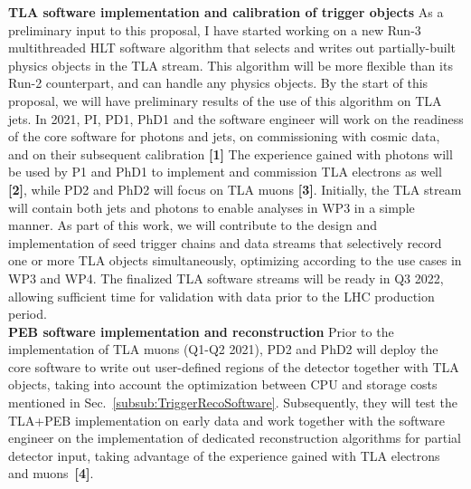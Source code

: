\textbf{TLA software implementation and calibration of trigger objects} As a preliminary input to this proposal, I have started working on a new Run-3 multithreaded HLT software algorithm that selects and writes out partially-built physics objects in the TLA stream. 
This algorithm will be more flexible than its Run-2 counterpart, and can handle any physics objects. 
By the start of this proposal, we will have preliminary results of the use of this algorithm on TLA jets. 
In 2021, PI, PD1, PhD1 and the software engineer
will work on the readiness of the core software for photons and jets, on commissioning with cosmic data, and on their subsequent calibration \textbf{[1]}
The experience gained with photons will be used by P1 and PhD1 to implement and commission TLA electrons as well \textbf{[2]}, while PD2 and PhD2 will focus on TLA muons \textbf{[3]}. 
Initially, the TLA stream will contain both jets and photons to enable analyses in WP3 in a simple manner. 
As part of this work, we will contribute to the design and implementation of seed trigger chains and data streams that selectively record one or more TLA objects simultaneously, optimizing according to the use cases in WP3 and WP4. 
The finalized TLA software streams will be ready in Q3 2022, allowing sufficient time for validation with data prior to the LHC production period. \\
\textbf{PEB software implementation and reconstruction} Prior to the implementation of TLA muons (Q1-Q2 2021), PD2 and PhD2 will deploy the core software to write out user-defined regions of the detector together with TLA objects, 
taking into account the optimization between CPU and storage costs mentioned in Sec.~\ref{subsub:TriggerRecoSoftware}. 
Subsequently, they will test the TLA+PEB implementation on early data and work together with the software engineer on the implementation of dedicated reconstruction algorithms for partial detector input, taking advantage of the experience gained with TLA electrons and muons~\textbf{[4]}. 
